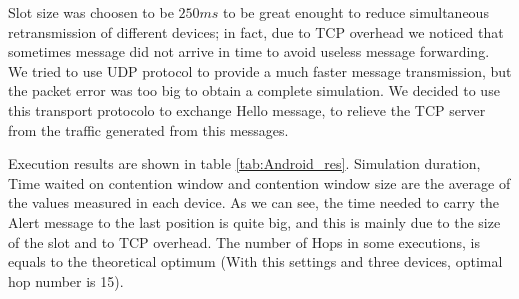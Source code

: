 
Slot size was choosen to be $250ms$ to be great enought to reduce simultaneous retransmission of different devices; in fact, due to TCP overhead we noticed that sometimes message did not arrive in time to avoid useless message forwarding. We tried to use UDP protocol to provide a much faster message transmission, but the packet error was too big to obtain a complete simulation. We decided to use this transport protocolo to exchange Hello message, to relieve the TCP server from the traffic generated from this messages.

Execution results are shown in table \ref{tab:Android_res}. Simulation duration, Time waited on contention window and contention window size are the average of the values measured in each device. As we can see, the time needed to carry the Alert message to the last position is quite big, and this is mainly due to the size of the slot and to TCP overhead. The number of Hops in some executions, is equals to the theoretical optimum (With this settings and three devices, optimal hop number is 15). 


